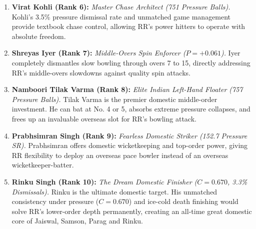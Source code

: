 \documentclass[11pt,a4paper]{article}
\begin{document}
\begin{enumerate}
    \item \textbf{Virat Kohli (Rank 6):} \textit{Master Chase Architect (751 Pressure Balls).} Kohli's 3.5\% pressure dismissal rate and unmatched game management provide textbook chase control, allowing RR's power hitters to operate with absolute freedom.
    \item \textbf{Shreyas Iyer (Rank 7):} \textit{Middle-Overs Spin Enforcer ($P = +0.061$).} Iyer completely dismantles slow bowling through overs 7 to 15, directly addressing RR's middle-overs slowdowns against quality spin attacks.
    \item \textbf{Namboori Tilak Varma (Rank 8):} \textit{Elite Indian Left-Hand Floater (757 Pressure Balls).} Tilak Varma is the premier domestic middle-order investment. He can bat at No. 4 or 5, absorbs extreme pressure collapses, and frees up an invaluable overseas slot for RR's bowling attack.
    \item \textbf{Prabhsimran Singh (Rank 9):} \textit{Fearless Domestic Striker (152.7 Pressure SR).} Prabhsimran offers domestic wicketkeeping and top-order power, giving RR flexibility to deploy an overseas pace bowler instead of an overseas wicketkeeper-batter.
    \item \textbf{Rinku Singh (Rank 10):} \textit{The Dream Domestic Finisher ($C = 0.670$, 3.3\% Dismissals).} Rinku is the ultimate domestic target. His unmatched consistency under pressure ($C = 0.670$) and ice-cold death finishing would solve RR's lower-order depth permanently, creating an all-time great domestic core of Jaiswal, Samson, Parag and Rinku.
\end{enumerate}
\end{document}
